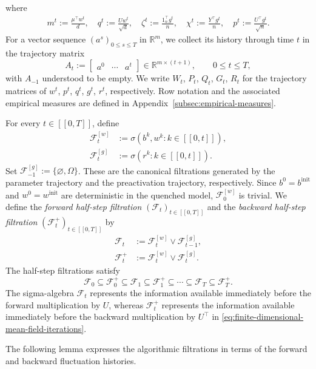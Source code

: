 where
\begin{align}
    m^t := \frac{\mu^\top w^t}{d}, \quad q^t :=  \frac{U w^t}{\sqrt d}
    , \quad 
    \zeta^t := \frac{1_n^\top g^t}{n}, \quad \chi^t := \frac{Y^\top g^t}{n}, \quad p^t := \frac{U^\top g^t}{\sqrt n}.
    \label{eq:finite-dim-macro}
\end{align}
For a vector sequence $(a^s)_{0 \le s \le T}$ in $\mathbb R^m$,
we collect its history through time $t$ in the trajectory matrix
\[
    A_t:=
    \begin{bmatrix}
        a^0 & \cdots & a^t
    \end{bmatrix}
    \in\mathbb R^{m\times(t+1)},
    \qquad 0\leq t\leq T,
\]
with $A_{-1}$ understood to be empty.
We write $W_t$, $P_t$, $Q_t$, $G_t$, $R_t$ for the trajectory matrices
of $w^t$, $p^t$, $q^t$, $g^t$, $r^t$, respectively.
Row notation and the associated empirical measures are
defined in Appendix~\ref{subsec:empirical-measures}.

\begin{definition}
\label{def:algorithmic-half-step-filtration}
For every \(t\in[\![0,T]\!]\), define
\begin{align}
    \mathcal F_t^{[w]}
    &:=
    \sigma\!\left(b^k,w^k:k\in[\![0,t]\!]\right),\\
    \mathcal F_t^{[g]}
    &:=
    \sigma\!\left(r^k:k\in[\![0,t]\!]\right).
\end{align}
Set $\mathcal F_{-1}^{[g]}:=\{\varnothing, \Omega\}$.
These are the canonical filtrations generated by the parameter trajectory and
the preactivation trajectory, respectively.
Since $b^0=b^{\mathrm{init}}$ and $w^0=w^{\mathrm{init}}$
are deterministic in the quenched model, \(\mathcal F_0^{[w]}\) is trivial.
We define the \emph{forward half-step filtration}
\((\mathcal F_t)_{t\in[\![0,T]\!]}\) and the \emph{backward half-step
filtration} \((\mathcal F_t^+)_{t\in[\![0,T]\!]}\) by
\begin{align}
    \mathcal F_t
    &:=
    \mathcal F_t^{[w]}\vee\mathcal F_{t-1}^{[g]},
    \label{eq:algorithmic-filtration-Ft}\\
    \mathcal F_t^+
    &:=
    \mathcal F_t^{[w]}\vee\mathcal F_t^{[g]}.
    \label{eq:algorithmic-filtration-Ft+}
\end{align}
The half-step filtrations satisfy
\[
    \mathcal F_0
    \subseteq
    \mathcal F_0^+
    \subseteq
    \mathcal F_1
    \subseteq
    \mathcal F_1^+
    \subseteq\cdots\subseteq
    \mathcal F_T
    \subseteq
    \mathcal F_T^+.
\]
The sigma-algebra \(\mathcal F_t\) represents the information available
immediately before the forward multiplication by \(U\), whereas
\(\mathcal F_t^+\) represents the information available immediately before
the backward multiplication by \(U^\top\) in \eqref{eq:finite-dimensional-mean-field-iterations}.
\end{definition}
The following lemma expresses the algorithmic filtrations in
terms of the forward and backward fluctuation histories.

